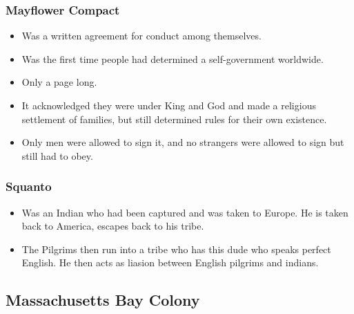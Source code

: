 \documentclass{article}
\begin{document}
        \subsubsection{Mayflower Compact}
          \begin{itemize}
            \item Was a written agreement for conduct among themselves.
            \item Was the first time people had determined a self-government worldwide.
            \item Only a page long.
            \item It acknowledged they were under King and God and made a religious settlement of families, but still determined rules for their own existence.
            \item Only men were allowed to sign it, and no strangers were allowed to sign but still had to obey. 
          \end{itemize}

        \subsubsection{Squanto}
          \begin{itemize}
            \item Was an Indian who had been captured and was taken to Europe. He is taken back to America, escapes back to his tribe.
            \item The Pilgrims then  run into a tribe who has this dude who speaks perfect English. He then acts as liasion between English pilgrims and indians. 
          \end{itemize}

    \subsection{Massachusetts Bay Colony}
\end{document}
